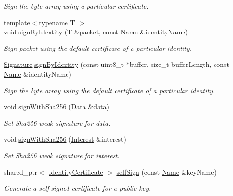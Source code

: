 \begin{DoxyCompactItemize}
\begin{DoxyCompactList}\small\item\em Sign the byte array using a particular certificate. \end{DoxyCompactList}\item 
{\footnotesize template$<$typename T $>$ }\\void \hyperlink{classndn_1_1security_1_1KeyChain_a12667fcdf3bef2250eb3b523b1e4f987}{sign\+By\+Identity} (T \&packet, const \hyperlink{classndn_1_1Name}{Name} \&identity\+Name)
\begin{DoxyCompactList}\small\item\em Sign packet using the default certificate of a particular identity. \end{DoxyCompactList}\item 
\hyperlink{classndn_1_1Signature}{Signature} \hyperlink{classndn_1_1security_1_1KeyChain_a77e1edd0663bf184deef4be2566c921b}{sign\+By\+Identity} (const uint8\+\_\+t $\ast$buffer, size\+\_\+t buffer\+Length, const \hyperlink{classndn_1_1Name}{Name} \&identity\+Name)
\begin{DoxyCompactList}\small\item\em Sign the byte array using the default certificate of a particular identity. \end{DoxyCompactList}\item 
void \hyperlink{classndn_1_1security_1_1KeyChain_ae68a5ce146b5902e6a2000650b948d14}{sign\+With\+Sha256} (\hyperlink{classndn_1_1Data}{Data} \&data)
\begin{DoxyCompactList}\small\item\em Set Sha256 weak signature for {\ttfamily data}. \end{DoxyCompactList}\item 
void \hyperlink{classndn_1_1security_1_1KeyChain_a093ee12db8424cac208881f477b0476e}{sign\+With\+Sha256} (\hyperlink{classndn_1_1Interest}{Interest} \&interest)
\begin{DoxyCompactList}\small\item\em Set Sha256 weak signature for {\ttfamily interest}. \end{DoxyCompactList}\item 
shared\+\_\+ptr$<$ \hyperlink{classndn_1_1IdentityCertificate}{Identity\+Certificate} $>$ \hyperlink{classndn_1_1security_1_1KeyChain_a99ced46f0a175455f86f175403662412}{self\+Sign} (const \hyperlink{classndn_1_1Name}{Name} \&key\+Name)
\begin{DoxyCompactList}\small\item\em Generate a self-\/signed certificate for a public key. \end{DoxyCompactList}\item 

\end{DoxyCompactItemize}
